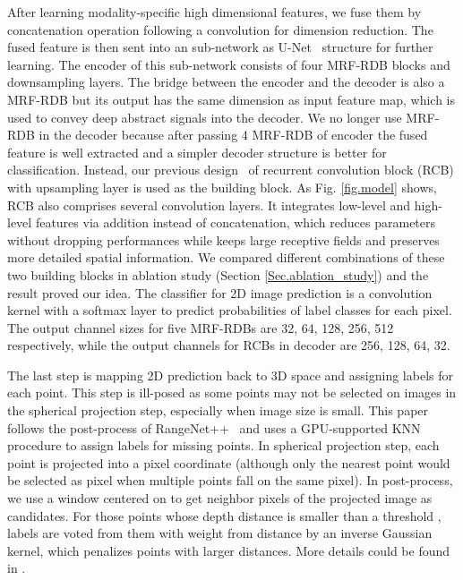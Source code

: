 \documentclass[preprint,review,3p]{elsarticle}
\begin{document}
After learning modality-specific high dimensional features, we fuse them by concatenation operation following a  convolution for dimension reduction. 
The fused feature is then sent into an sub-network as U-Net~\cite{ronneberger2015u} structure for further learning. The encoder of this sub-network consists of four MRF-RDB blocks and downsampling layers. The bridge between the encoder and the decoder is also a MRF-RDB but its output has the same dimension as input feature map, which is used to convey deep abstract signals into the decoder. 
We no longer use MRF-RDB in the decoder because after passing 4 MRF-RDB of encoder the fused feature is well extracted and a simpler decoder structure is better for classification. Instead, our previous design~\cite{yang2019road} of recurrent convolution block (RCB) with upsampling layer is used as the building block. As Fig. \ref{fig.model} shows, RCB also comprises several convolution layers. It integrates low-level and high-level features via addition instead of concatenation, which reduces parameters without dropping performances while keeps large receptive fields and preserves more detailed spatial information. We compared different combinations of these two building blocks in ablation study  (Section \ref{Sec.ablation_study}) and the result proved our idea. The classifier for 2D image prediction is a  convolution kernel with a softmax layer to predict probabilities of label classes for each pixel. The output channel sizes for five MRF-RDBs are 32, 64, 128, 256, 512 respectively, while the output channels for RCBs in decoder are 256, 128, 64, 32. 

The last step is mapping 2D prediction back to 3D space and assigning labels for each point. This step is ill-posed as some points may not be selected on images in the spherical projection step, especially when image size is small. This paper follows the post-process of RangeNet++~\cite{milioto2019rangenet++} and uses a GPU-supported KNN procedure to assign labels for missing points. In spherical projection step, each point  is projected into a pixel coordinate  (although only the nearest point would be selected as pixel when multiple points fall on the same pixel). In post-process, we use a  window centered on  to get  neighbor pixels of the projected image as candidates. For those  points whose depth distance is smaller than a threshold , labels are voted from them with weight from distance by an inverse Gaussian kernel, which penalizes points with larger distances. More details could be found in \cite{milioto2019rangenet++}.
\end{document}
